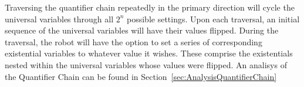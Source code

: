 Traversing the quantifier chain
repeatedly in the primary direction will cycle the universal variables through all $2^n$ possible settings.
Upon each traversal, an initial sequence of the universal variables will have their values flipped.
During the traversal, the robot will have the option to set a series of corresponding existential variables to whatever value it wishes. These comprise the existentials nested within the universal variables whose values were flipped. An analisys of the Quantifier Chain can be found in Section~\ref{sec:AnalysisQuantifierChain}
%
%
%
%
%
%

